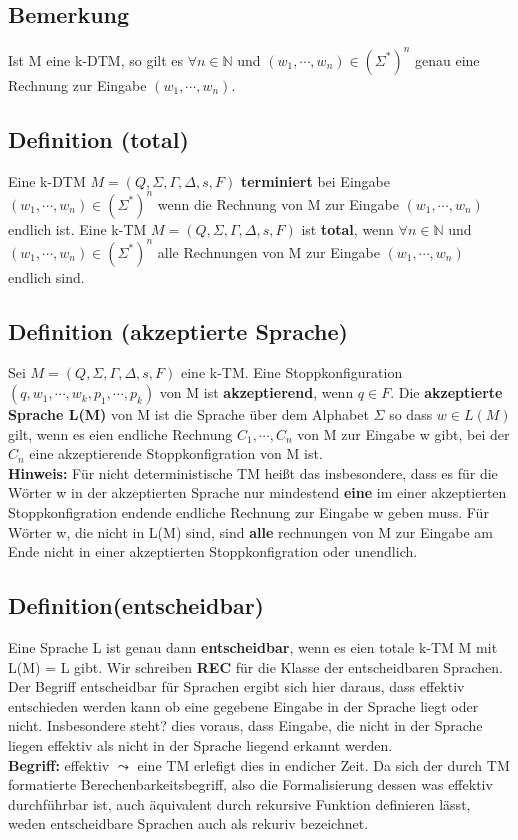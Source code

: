 \documentclass[a4paper,11pt]{article}
\begin{document}
\subsection{Bemerkung} Ist M eine k-DTM, so gilt es $\forall n \in \mathbb{N}$ und $(w_1, \cdots, w_n) \in (\Sigma^*)^n$ genau eine Rechnung zur Eingabe $(w_1, \cdots, w_n)$.

\subsection{Definition (total)} Eine k-DTM $M = (Q, \Sigma, \Gamma, \Delta, s, F)$ \textbf{terminiert} bei Eingabe $(w_1, \cdots, w_n) \in (\Sigma^*)^n$ wenn die Rechnung von M zur Eingabe $(w_1, \cdots, w_n)$ endlich ist. Eine k-TM $M = (Q, \Sigma, \Gamma, \Delta, s, F)$ ist \textbf{total}, wenn $\forall n \in \mathbb{N}$ und $(w_1, \cdots, w_n) \in (\Sigma^*)^n$ alle Rechnungen von M zur Eingabe $(w_1, \cdots, w_n)$ endlich sind.

\subsection{Definition (akzeptierte Sprache)} Sei $M = (Q, \Sigma, \Gamma, \Delta, s, F)$ eine k-TM. Eine Stoppkonfiguration $(q, w_1, \cdots, w_k, p_1, \cdots, p_k)$ von M ist \textbf{akzeptierend}, wenn $q \in F$. Die \textbf{akzeptierte Sprache L(M)} von M ist die Sprache über dem Alphabet $\Sigma$ so dass $w\in L(M)$ gilt, wenn es eien endliche Rechnung $C_1, \cdots, C_n$ von M zur Eingabe w gibt, bei der $C_n$ eine akzeptierende Stoppkonfigration von M ist. \\ \textbf{Hinweis: } Für nicht deterministische TM heißt das insbesondere, dass es für die Wörter w in der akzeptierten Sprache nur mindestend \textbf{eine} im einer akzeptierten Stoppkonfigration endende endliche Rechnung zur Eingabe w geben muss. Für Wörter w, die nicht in L(M) sind, sind \textbf{alle} rechnungen von M zur Eingabe am Ende nicht in einer akzeptierten Stoppkonfigration oder unendlich.

\subsection{Definition(entscheidbar)}
Eine Sprache L ist genau dann \textbf{entscheidbar}, wenn es eien totale k-TM M mit L(M) = L gibt. Wir schreiben \textbf{REC} für die Klasse der entscheidbaren Sprachen. Der Begriff entscheidbar für Sprachen ergibt sich hier daraus, dass effektiv entschieden werden kann ob eine gegebene Eingabe in der Sprache liegt oder nicht. Insbesondere steht? dies voraus, dass Eingabe, die nicht in der Sprache liegen effektiv als nicht in der Sprache liegend erkannt werden. \\ \textbf{Begriff: } effektiv $\leadsto$ eine TM erlefigt dies in endicher Zeit. Da sich der durch TM formatierte Berechenbarkeitsbegriff, also die Formalisierung dessen was effektiv durchführbar ist, auch äquivalent durch rekursive Funktion definieren lässt, weden entscheidbare Sprachen auch als rekuriv bezeichnet.
\end{document}
